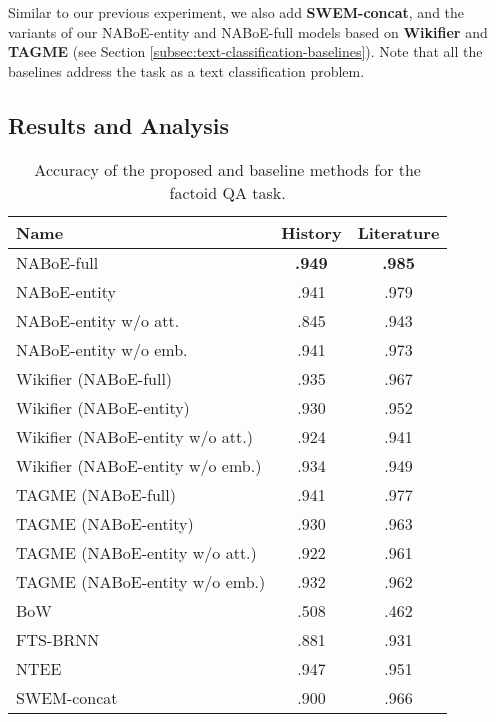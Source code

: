 \documentclass[11pt,a4paper]{article}
\begin{document}
    Similar to our previous experiment, we also add \textbf{SWEM-concat}, and the variants of our NABoE-entity and NABoE-full models based on \textbf{Wikifier} and \textbf{TAGME} (see Section \ref{subsec:text-classification-baselines}).
    Note that all the baselines address the task as a text classification problem.

    \subsection{Results and Analysis}

    \begin{table}[tb]
        \centering
        \setlength\tabcolsep{3.5pt}
        \small{
        \begin{tabular}{l|cc}
            Name & History & Literature\\
            \hline
            NABoE-full                & \textbf{.949} & \textbf{.985}\\
            NABoE-entity              &         .941  &         .979 \\
            NABoE-entity w/o att.     &         .845  &         .943 \\
            NABoE-entity w/o emb.     &         .941  &         .973 \\
            \hline
            Wikifier (NABoE-full)            &         .935  &         .967\\
            Wikifier (NABoE-entity)          &         .930  &         .952\\
            Wikifier (NABoE-entity w/o att.) &         .924  &         .941\\
            Wikifier (NABoE-entity w/o emb.) &         .934  &         .949\\
            \hline
            TAGME (NABoE-full)               &         .941  &         .977\\
            TAGME (NABoE-entity)             &         .930  &         .963\\
            TAGME (NABoE-entity w/o att.)    &         .922  &         .961\\
            TAGME (NABoE-entity w/o emb.)    &         .932  &         .962\\
            \hline
            BoW                        &         .508  &         .462\\
            FTS-BRNN                   &         .881  &         .931\\
            NTEE                       &         .947  &         .951\\
            SWEM-concat                &         .900  &         .966\\
        \end{tabular}
        }
        \caption{Accuracy of the proposed and baseline methods for the factoid QA task.}
        \label{tb:qb-results}
    \end{table}
\end{document}
